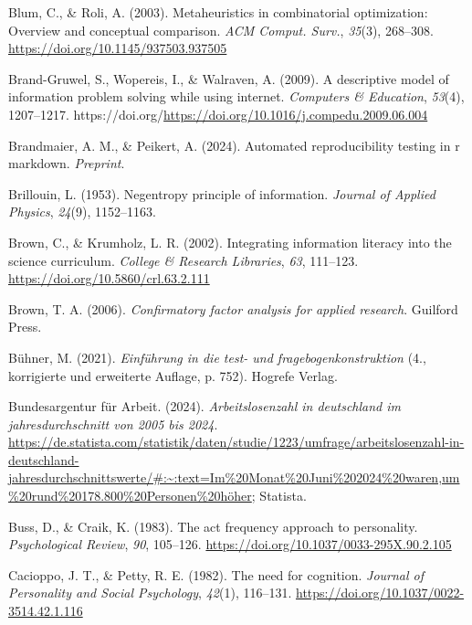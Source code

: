\documentclass[
  12pt,
  a4paper,
  twoside]{article}
\newlength{\cslhangindent}
\newenvironment{CSLReferences}[2] %
 {\begin{list}{}{%
  \setlength{\itemindent}{0pt}
  \setlength{\leftmargin}{0pt}
  \setlength{\parsep}{0pt}
  \ifodd #1
   \setlength{\leftmargin}{\cslhangindent}
   \setlength{\itemindent}{-1\cslhangindent}
  \fi
  \setlength{\itemsep}{#2\baselineskip}}}
 {\end{list}}
\begin{document}
\begin{CSLReferences}{1}{0}
Blum, C., \& Roli, A. (2003). Metaheuristics in combinatorial optimization: Overview and conceptual comparison. \emph{ACM Comput. Surv.}, \emph{35}(3), 268--308. \url{https://doi.org/10.1145/937503.937505}

Brand-Gruwel, S., Wopereis, I., \& Walraven, A. (2009). A descriptive model of information problem solving while using internet. \emph{Computers \& Education}, \emph{53}(4), 1207--1217. https://doi.org/\url{https://doi.org/10.1016/j.compedu.2009.06.004}

Brandmaier, A. M., \& Peikert, A. (2024). Automated reproducibility testing in r markdown. \emph{Preprint}.

Brillouin, L. (1953). Negentropy principle of information. \emph{Journal of Applied Physics}, \emph{24}(9), 1152--1163.

Brown, C., \& Krumholz, L. R. (2002). Integrating information literacy into the science curriculum. \emph{College \& Research Libraries}, \emph{63}, 111--123. \url{https://doi.org/10.5860/crl.63.2.111}

Brown, T. A. (2006). \emph{Confirmatory factor analysis for applied research}. Guilford Press.

Bühner, M. (2021). \emph{Einführung in die test- und fragebogenkonstruktion} (4., korrigierte und erweiterte Auflage, p. 752). Hogrefe Verlag.

Bundesargentur für Arbeit. (2024). \emph{Arbeitslosenzahl in deutschland im jahresdurchschnitt von 2005 bis 2024}. \url{https://de.statista.com/statistik/daten/studie/1223/umfrage/arbeitslosenzahl-in-deutschland-jahresdurchschnittswerte/\#:~:text=Im\%20Monat\%20Juni\%202024\%20waren,um\%20rund\%20178.800\%20Personen\%20höher}; Statista.

Buss, D., \& Craik, K. (1983). The act frequency approach to personality. \emph{Psychological Review}, \emph{90}, 105--126. \url{https://doi.org/10.1037/0033-295X.90.2.105}

Cacioppo, J. T., \& Petty, R. E. (1982). The need for cognition. \emph{Journal of Personality and Social Psychology}, \emph{42}(1), 116--131. \url{https://doi.org/10.1037/0022-3514.42.1.116}


\end{CSLReferences}
\end{document}
